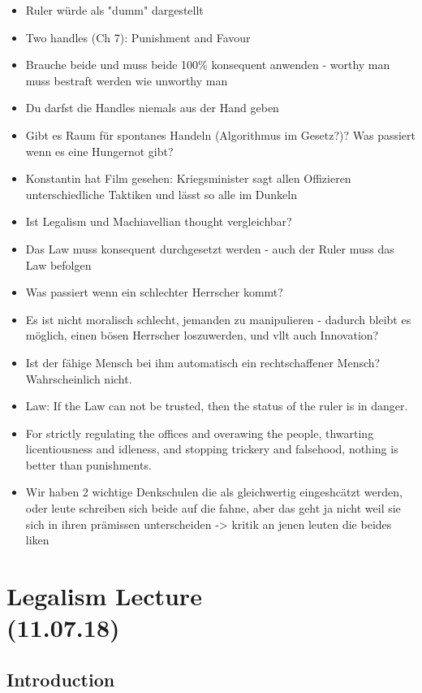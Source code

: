 \documentclass[emulatestandardclasses]{scrartcl}
\begin{document}
\begin{itemize}
  \item Ruler würde als "dumm" dargestellt
  \item Two handles (Ch 7): Punishment and Favour
  \item Brauche beide und muss beide 100\% konsequent anwenden - worthy man muss bestraft werden wie unworthy man
  \item Du darfst die Handles niemals aus der Hand geben 
  \item Gibt es Raum für spontanes Handeln (Algorithmus im Gesetz?)? Was passiert wenn es eine Hungernot gibt?
  \item Konstantin hat Film gesehen: Kriegsminister sagt allen Offizieren unterschiedliche Taktiken und lässt so alle im Dunkeln
  \item Ist Legalism und Machiavellian thought vergleichbar?
  \item Das Law muss konsequent durchgesetzt werden - auch der Ruler muss das Law befolgen
  \item Was passiert wenn ein schlechter Herrscher kommt?
  \item Es ist nicht moralisch schlecht, jemanden zu manipulieren - dadurch bleibt es möglich, einen bösen Herrscher loszuwerden, und vllt auch Innovation?
  \item Ist der fähige Mensch bei ihm automatisch ein rechtschaffener Mensch? Wahrscheinlich nicht.
  \item Law: If the Law can not be trusted, then the status of the ruler is in danger.
  \item For strictly regulating the offices and overawing the people, thwarting licentiousness and idleness, and stopping trickery and falsehood, nothing is better than punishments.
  \item Wir haben 2 wichtige Denkschulen die als gleichwertig eingeshcätzt werden, oder leute schreiben sich beide auf die fahne, aber das geht ja nicht weil sie sich in ihren prämissen unterscheiden -> kritik an jenen leuten die beides liken 
\end{itemize}



\section{Legalism Lecture\\(11.07.18)}

\subsection{Introduction}
\end{document}
